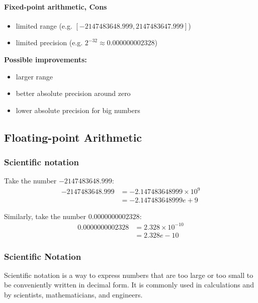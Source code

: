 \documentclass[12pt]{article}
\begin{document}
\paragraph{Fixed-point arithmetic, Cons}
\begin{itemize}
    \item limited range (e.g. $[-2147483648.999, 2147483647.999]$)
    \item limited precision (e.g. $2^{-32} \approx 0.000000002328$)
\end{itemize}

\textbf{Possible improvements:}
\begin{itemize}
    \item larger range
    \item better absolute precision around zero
    \item lower absolute precision for big numbers
\end{itemize}

\subsection{Floating-point Arithmetic}



\subsubsection{Scientific notation}

Take the number $-2147483648.999$: 
\begin{align*}
-2147483648.999 &= -2.147483648999 \times 10^{9} \\
&= -2.147483648999e+9
\end{align*}

Similarly, take the number $0.0000000002328$:
\begin{align*}
0.0000000002328 &= 2.328 \times 10^{-10} \\
&= 2.328e-10
\end{align*}

\subsubsection{Scientific Notation}
Scientific notation is a way to express numbers that are too large or too small to be conveniently written in decimal form. It is commonly used in calculations and by scientists, mathematicians, and engineers.
\end{document}
